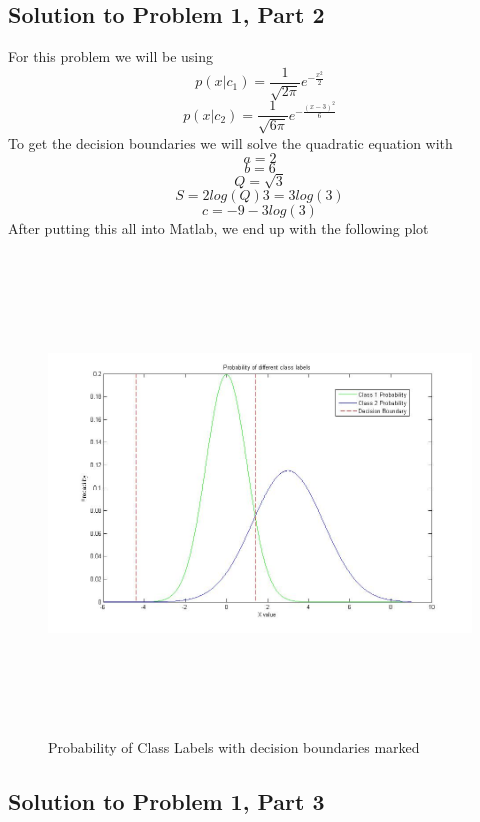 \documentclass[11pt,psfig]{article}
\begin{document}
\subsection*{Solution to Problem 1, Part 2}

For this problem we will be using
\[
p(x|c_1) = \frac{1}{\sqrt{2\pi}} e^{- \frac{x^2}{2}}
\]
\[
p(x|c_2) = \frac{1}{\sqrt{6\pi}} e^{- \frac{(x-3)^2}{6}}
\]
To get the decision boundaries we will solve the quadratic equation with
\[
a = 2
\]
\[
b = 6
\]
\[
Q = \sqrt{3}
\]
\[
S = 2 log(Q) 3 = 3log(3)
\]
\[
c = -9 - 3 log(3)
\]
After putting this all into Matlab, we end up with the following plot
\begin{figure}[H]
\centering
\includegraphics[height=5in]{prob1plot.jpg}
\caption{Probability of Class Labels with decision boundaries marked}
\end{figure}

\subsection*{Solution to Problem 1, Part 3}
\end{document}
